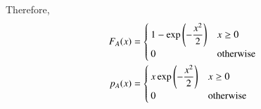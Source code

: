\documentclass[journal,12pt,twocolumn]{IEEEtran}
\renewcommand\thesection{\arabic{section}}
\begin{document}
\begin{enumerate}[label=\thesection.\arabic*
,ref=\thesection.\theenumi]
	Therefore,
	\begin{align*}
		F_A(x) &= 
		\begin{cases}
			1 - \exp\left(-\dfrac{x^2}{2}\right) & x \geq 0 \\
			0 & \text{otherwise}
		\end{cases}	\\
		p_A(x) &= 
		\begin{cases}
			x \exp\left(-\dfrac{x^2}{2}\right) & x \geq 0 \\
			0 & \text{otherwise}
		\end{cases}
	\end{align*}
\end{enumerate}
\end{document}
